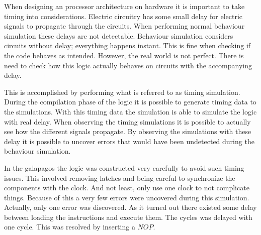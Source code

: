 When designing an processor architecture on hardware it is important to take timing into considerations. Electric circuitry has some small delay for electric signals to propagate through the circuits. When performing normal behaviour simulation these delays are not detectable. Behaviour simulation considers circuits without delay; everything happens instant. This is fine when checking if the code behaves as intended. However, the real world is not perfect. There is need to check how this logic actually behaves on circuits with the accompanying delay. 

This is accomplished by performing what is referred to as timing simulation. During the compilation phase of the logic it is possible to generate timing data to the simulations. With this timing data the simulation is able to simulate the logic with real delay. When observing the timing simulations it is possible to actually see how the different signals propagate. By observing the simulations with these delay it is possible to uncover errors that would have been undetected during the behaviour simulation. 

In the galapagos the logic was constructed very carefully to avoid such timing issues. This involved removing latches and being careful to synchronize the components with the clock. And not least, only use one clock to not complicate things. Because of this a very few errors were uncovered during this simulation. Actually, only one error was discovered. As it turned out there existed some delay between loading the instructions and execute them. The cycles was delayed with one cycle. This was resolved by inserting a $NOP$.  


